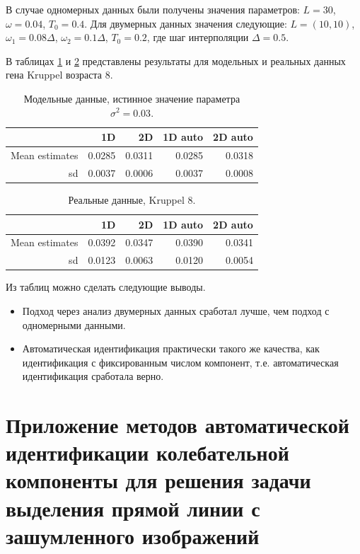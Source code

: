 \documentclass[specialist,
               substylefile = spbu.rtx,
               subf,href,colorlinks=true, 12pt]{disser}
\begin{document}
В случае одномерных данных были получены значения параметров: $L=30$, $\omega=0.04$, $T_0=0.4$.
Для двумерных данных значения следующие:  $L=(10,10)$, $\omega_{1}=0.08 \Delta$,
  $\omega_{2}=0.1 \Delta$, $T_0=0.2$, где шаг интерполяции $\Delta = 0.5$.

В таблицах \ref{tab:model_est_compare} и \ref{tab:real_est_compare} представлены результаты для модельных и реальных данных гена Kruppel возраста 8.

 \begin{table}[hhh!]
\caption{Модельные данные, истинное значение параметра $\sigma^2=0.03$.}
 \centering
 \begin{tabular}{rrrrr}
  \hline
  & 1D  & 2D  & 1D auto  & 2D auto \\
  \hline
  Mean estimates & 0.0285 & 0.0311 & 0.0285 & 0.0318 \\
  sd & 0.0037 & 0.0006 & 0.0037 & 0.0008 \\
 \end{tabular}
  \label{tab:model_est_compare}
 \end{table}
  \begin{table}[hhh!]
\caption{Реальные данные, Kruppel 8.}
 \centering
 \begin{tabular}{rrrrr}
  \hline
  & 1D  & 2D   & 1D auto & 2D auto \\
  \hline
  Mean estimates & 0.0392 & 0.0347 & 0.0390 & 0.0341 \\
  sd & 0.0123 & 0.0063 & 0.0120 & 0.0054 \\
 \end{tabular}
 \label{tab:real_est_compare}
 \end{table}

Из таблиц можно сделать следующие выводы.
\begin{itemize}
\item Подход через анализ двумерных данных сработал лучше, чем подход с одномерными данными.
\item Автоматическая идентификация практически такого же качества, как идентификация с фиксированным числом компонент, т.е. автоматическая идентификация сработала верно.
\end{itemize}

\section{Приложение методов автоматической идентификации колебательной компоненты для решения задачи выделения прямой линии с зашумленного изображений}
\label{sec:use_cssa}
\end{document}
